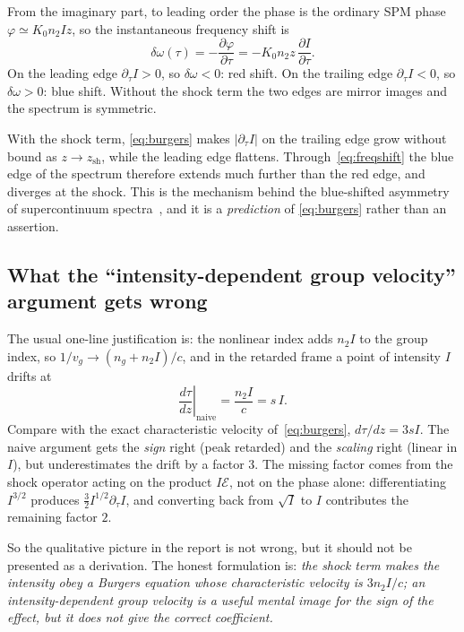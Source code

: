 \documentclass[11pt,a4paper]{article}
\begin{document}
From the imaginary part, to leading order the phase is the ordinary SPM phase
$\varphi \simeq K_0 n_2 I z$, so the instantaneous frequency shift is
\begin{equation}
\label{eq:freqshift}
\delta\omega(\tau) = -\frac{\partial\varphi}{\partial\tau}
 = -K_0 n_2 z\,\frac{\partial I}{\partial\tau}.
\end{equation}
On the leading edge $\partial_\tau I>0$, so $\delta\omega<0$: red shift. On the
trailing edge $\partial_\tau I<0$, so $\delta\omega>0$: blue shift. Without the
shock term the two edges are mirror images and the spectrum is symmetric.

With the shock term, \eqref{eq:burgers} makes $|\partial_\tau I|$ on the
trailing edge grow without bound as $z\to z_{\text{sh}}$, while the leading edge
flattens. Through~\eqref{eq:freqshift} the blue edge of the spectrum therefore
extends much further than the red edge, and diverges at the shock. This is the
mechanism behind the blue-shifted asymmetry of supercontinuum
spectra~\cite{rothenberg1992,gaeta2000}, and it is a \emph{prediction} of
\eqref{eq:burgers} rather than an assertion.

\subsection{What the ``intensity-dependent group velocity'' argument gets wrong}

The usual one-line justification is: the nonlinear index adds $n_2I$ to the
group index, so $1/v_g \to (n_g+n_2I)/c$, and in the retarded frame a point of
intensity $I$ drifts at
\begin{equation}
\left.\frac{d\tau}{dz}\right|_{\text{naive}} = \frac{n_2 I}{c} = s\,I .
\end{equation}
Compare with the exact characteristic velocity of~\eqref{eq:burgers},
$d\tau/dz = 3sI$. The naive argument gets the \emph{sign} right (peak retarded)
and the \emph{scaling} right (linear in $I$), but underestimates the drift by a
factor $3$. The missing factor comes from the shock operator acting on the
product $I\mathcal{E}$, not on the phase alone: differentiating $I^{3/2}$
produces $\tfrac32 I^{1/2}\partial_\tau I$, and converting back from
$\sqrt I$ to $I$ contributes the remaining factor $2$.

So the qualitative picture in the report is not wrong, but it should not be
presented as a derivation. The honest formulation is: \emph{the shock term makes
the intensity obey a Burgers equation whose characteristic velocity is
$3n_2I/c$; an intensity-dependent group velocity is a useful mental image for
the sign of the effect, but it does not give the correct coefficient.}
\end{document}
